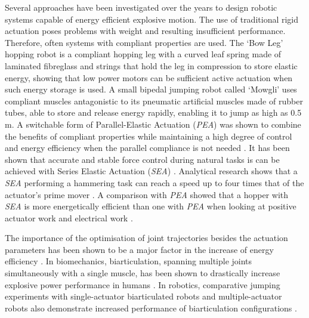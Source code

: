 \documentclass[letterpaper, 10 pt, conference]{ieeeconf}  %
\begin{document}
	Several approaches have been investigated over the years to design robotic systems capable of energy efficient explosive motion. The use of traditional rigid actuation poses problems with weight and resulting insufficient performance. Therefore, often systems with compliant properties are used. The `Bow Leg' hopping robot \cite{zeglin1999bow} is a compliant hopping leg with a curved leaf spring made of laminated fibreglass and strings that hold the leg in compression to store elastic energy, showing that low power motors can be sufficient active actuation when such energy storage is used. A small bipedal jumping robot called `Mowgli' \cite{niiyama2007mowgli} uses compliant muscles antagonistic to its pneumatic artificial muscles made of rubber tubes, able to store and release energy rapidly, enabling it to jump as high as 0.5\,m. A switchable form of Parallel-Elastic Actuation (\textit{PEA}) was shown to combine the benefits of compliant properties while maintaining a high degree of control and energy efficiency when the parallel compliance is not needed \cite{liu2015spear}. It has been shown that accurate and stable force control during natural tasks is can be achieved with Series Elastic Actuation (\textit{SEA}) \cite{pratt1995series}. Analytical research shows that a \textit{SEA} performing a hammering task can reach a speed up to four times that of the actuator’s prime mover \cite{garabini2011optimality}. A comparison with \textit{PEA} showed that a hopper with \textit{SEA} is more energetically efficient than one with \textit{PEA} when looking at positive actuator work and electrical work \cite{yesilevskiy2015comparison}.
	
	The importance of the optimisation of joint trajectories besides the actuation parameters has been shown to be a major factor in the increase of energy efficiency \cite{velasco2013soft}. In biomechanics, biarticulation, spanning multiple joints simultaneously with a single muscle, has been shown to drastically increase explosive power performance in humans \cite{schenau1989rotation,prilutsky1994tendon}. In robotics, comparative jumping experiments with single-actuator biarticulated robots and multiple-actuator robots also demonstrate increased performance of biarticulation configurations \cite{oshima2007jumping,babivc2009biarticulated,hyon2002development}.
	
\end{document}
